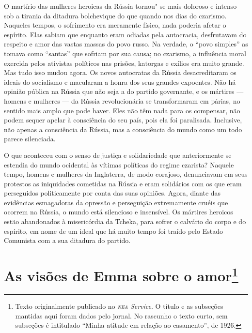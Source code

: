 O martírio das mulheres heroicas da Rússia tornou"-se mais doloroso e
intenso sob a tirania da ditadura bolchevique do que quando nos dias do
czarismo. Naqueles tempos, o sofrimento era meramente físico, nada
poderia afetar o espírito. Elas sabiam que enquanto eram odiadas pela
autocracia, desfrutavam do respeito e amor das vastas massas do povo
russo. Na verdade, o ``povo simples'' as tomava como ``santas'' que
sofriam por sua causa; no czarismo, a influência moral exercida pelos
ativistas políticos nas prisões, katorgas e exílios era muito grande.
Mas tudo isso mudou agora. Os novos autocratas da Rússia desacreditaram
os ideais do socialismo e macularam a honra dos seus grandes expoentes.
Não há opinião pública na Rússia que não seja a do partido governante, e\label{ref2}
os mártires --- homens e mulheres --- da Rússia revolucionária se
transformaram em párias, no sentido mais amplo que pode haver. Eles não
têm nada para os compensar, não podem sequer apelar à consciência do seu
país, pois ela foi paralisada. Inclusive, não apenas a consciência da
Rússia, mas a consciência do mundo como um todo parece silenciada.

O que aconteceu com o senso de justiça e solidariedade que
anteriormente se estendia do mundo ocidental às vítimas políticas do
regime czarista? Naquele tempo, homens e mulheres da Inglaterra, de modo
corajoso, denunciavam em seus protestos as iniquidades cometidas na
Rússia e eram solidários com os que eram perseguidos politicamente por
conta das suas opiniões. Agora, diante das evidências esmagadoras da
opressão e perseguição extremamente cruéis que ocorrem na Rússia, o
mundo está silencioso e insensível. Os mártires heroicos estão
abandonados à misericórdia da Tcheka, para sofrer o calvário do corpo e
do espírito, em nome de um ideal que há muito tempo foi traído pelo
Estado Comunista com a sua ditadura do partido.

\chapter{As visões de Emma sobre o amor\footnote{Texto originalmente publicado no
  \emph{\textsc{nea} Service}. O título e as subseções mantidas
  aqui foram dados pelo jornal. No rascunho o texto curto, sem
  subseções é intitulado ``Minha atitude em relação ao casamento'', de 1926.}}


